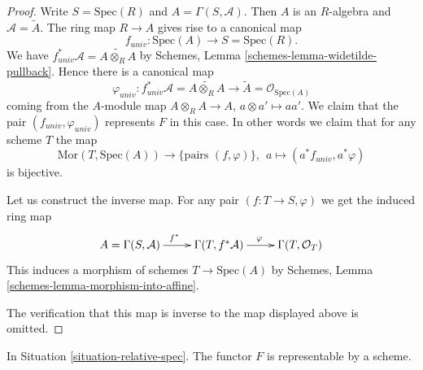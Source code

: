 \begin{proof}
Write $S = \text{Spec}(R)$ and $A = \Gamma(S, \mathcal{A})$.
Then $A$ is an $R$-algebra and $\mathcal{A} = \widetilde A$.
The ring map $R \to A$ gives rise to a canonical map
$$
f_{univ} : \text{Spec}(A)
\longrightarrow
S = \text{Spec}(R).
$$
We have
$f_{univ}^*\mathcal{A} =  \widetilde{A \otimes_R A}$
by Schemes, Lemma \ref{schemes-lemma-widetilde-pullback}.
Hence there is a canonical map
$$
\varphi_{univ} :
f_{univ}^*\mathcal{A} = \widetilde{A \otimes_R A}
\longrightarrow
\widetilde A = \mathcal{O}_{\text{Spec}(A)}
$$
coming from the $A$-module map $A \otimes_R A \to A$,
$a \otimes a' \mapsto aa'$. We claim that the pair
$(f_{univ}, \varphi_{univ})$ represents $F$ in this case.
In other words we claim that for any scheme $T$ the map
$$
\text{Mor}(T, \text{Spec}(A)) \longrightarrow
\{\text{pairs } (f, \varphi)\}, \ \ 
a \longmapsto (a^*f_{univ}, a^*\varphi)
$$
is bijective.

\medskip\noindent
Let us construct the inverse map.
For any pair $(f : T \to S, \varphi)$ we get the induced
ring map
$$
\xymatrix{
A = \Gamma(S, \mathcal{A}) \ar[r]^{f^*} &
\Gamma(T, f^*\mathcal{A}) \ar[r]^{\varphi} &
\Gamma(T, \mathcal{O}_T)
}
$$
This induces a morphism of schemes $T \to \text{Spec}(A)$
by Schemes, Lemma \ref{schemes-lemma-morphism-into-affine}.

\medskip\noindent
The verification that this map is inverse to the map
displayed above is omitted.
\end{proof}

\begin{lemma}
\label{lemma-spec}
In Situation \ref{situation-relative-spec}.
The functor $F$ is representable by a scheme.
\end{lemma}

